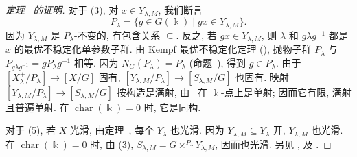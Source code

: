 \begin{proof}[定理~ 的证明]
对于 (3), 对 $x\in Y_{\lambda,M}$, 我们断言
\begin{equation}\label{src:8.7.4}
P_\lambda=\{g\in G(\Bbbk)\mid gx\in Y_{\lambda,M}\}.
\end{equation}
因为 $Y_{\lambda,M}$ 是 $P_\lambda$-不变的, 有包含关系 $\subseteq$. 反之, 若 $gx\in Y_{\lambda,M}$, 则 $\lambda$ 和 $g\lambda g^{-1}$ 都是 $x$ 的最优不稳定化单参数子群. 由 Kempf 最优不稳定化定理 (), 抛物子群 $P_\lambda$ 与 $P_{g\lambda g^{-1}}=gP_\lambda g^{-1}$ 相等. 因为 $N_G(P_\lambda)=P_\lambda$ (命题~), 得到 $g\in P_\lambda$. 由于 $[X_\lambda^+/P_\lambda]\to[X/G]$ 固有, $[Y_{\lambda,M}/P_\lambda]\to[S_{\lambda,M}/G]$ 也固有. 映射 $[Y_{\lambda,M}/P_\lambda]\to[S_{\lambda,M}/G]$ 按构造是满射, 由~ 在 $\Bbbk$-点上是单射; 因而它有限, 满射且普遍单射. 在 $\operatorname{char}(\Bbbk)=0$ 时, 它是同构.

对于 (5), 若 $X$ 光滑, 由定理~, 每个 $Y_\lambda$ 也光滑. 因为 $Y_{\lambda,M}\subseteq Y_\lambda$ 开, $Y_{\lambda,M}$ 也光滑. 在 $\operatorname{char}(\Bbbk)=0$ 时, 由 (3), $S_{\lambda,M}=G\times^{P_\lambda}Y_{\lambda,M}$, 因而也光滑. 另见 \cite[\S3]{Hes81}, \cite[\S4]{Hes79} 及 \cite[定理 12.26 和 13.5]{Kir84}.
\end{proof}

